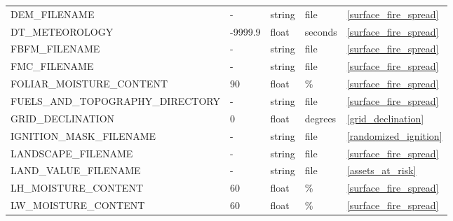 \begin{landscape}
\begin{center}
\begin{longtable}{lllll}
DEM\_FILENAME                                & -                          & string                 & file                               & \ref{surface_fire_spread}            \\
DT\_METEOROLOGY                              & -9999.9                    & float                  & seconds                            & \ref{surface_fire_spread}            \\
FBFM\_FILENAME                               & -                          & string                 & file                               & \ref{surface_fire_spread}            \\
FMC\_FILENAME                                & -                          & string                 & file                               & \ref{surface_fire_spread}            \\
FOLIAR\_MOISTURE\_CONTENT                    & 90                         & float                  & \%                                 & \ref{surface_fire_spread}            \\
FUELS\_AND\_TOPOGRAPHY\_DIRECTORY            & -                          & string                 & file                               & \ref{surface_fire_spread}            \\
GRID\_DECLINATION                            & 0                          & float                  & degrees                            & \ref{grid_declination}               \\
IGNITION\_MASK\_FILENAME                     & -                          & string                 & file                               & \ref{randomized_ignition}            \\
LANDSCAPE\_FILENAME                          & -                          & string                 & file                               & \ref{surface_fire_spread}            \\
LAND\_VALUE\_FILENAME                        & -                          & string                 & file                               & \ref{assets_at_risk}                 \\
LH\_MOISTURE\_CONTENT                        & 60                         & float                  & \%                                 & \ref{surface_fire_spread}            \\
LW\_MOISTURE\_CONTENT                        & 60                         & float                  & \%                                 & \ref{surface_fire_spread}            \\

\end{longtable}
\end{center}
\end{landscape}
